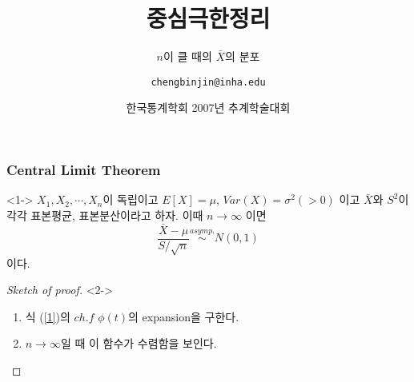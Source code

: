 \documentclass{beamer}
\title{중심극한정리}
\subtitle{$n$이 클 때의 $\bar{X}$의 분포}
\author[Cheng-Bin Jin]{\texttt{chengbinjin@inha.edu}}
\date[\today]{한국통계학회 2007년 추계학술대회}
\institute{인하대 정보통신학과}
\begin{document}

\begin{frame}
\titlepage
\end{frame}

\begin{frame}
\frametitle{Central Limit Theorem}
\begin{theorem}<1->
$X_1, X_2, \cdots, X_n$이 독립이고 $E[X] = \mu$,
$Var(X)=\sigma^2 (>0)$ 이고 $\bar{X}$와 $S^2$이 각각
표본평균, 표본분산이라고 하자.
이때 $n \rightarrow \infty$ 이면
\begin{equation} \label{1}
\frac{\bar{X} - \mu}{S/\sqrt{n}} \stackrel{asymp.}{\sim}N(0,1)
\end{equation}
이다.
\end{theorem}
\begin{proof}[Sketch of proof]<2->
\begin{enumerate}
\item<3-> 식 (\ref{1})의 $ch.f$ $\phi(t)$의 expansion을 구한다.
\item<4-> $n \rightarrow \infty$일 때 이 함수가 수렴함을 보인다.
\end{enumerate}
\end{proof}
\end{frame}
\end{document}
